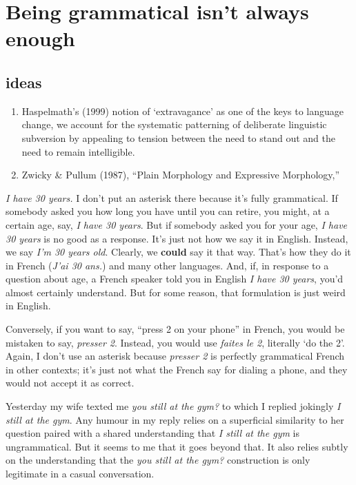 \chapter{Being grammatical isn't always enough}

\section{ideas}
\begin{enumerate}
    \item Haspelmath's (1999) notion of `extravagance' as one of the keys to language change, we account for the systematic patterning of deliberate linguistic subversion by appealing to tension between the need to stand out and the need to remain intelligible.
    \item Zwicky \& Pullum (1987), ``Plain Morphology and Expressive Morphology,''
\end{enumerate}

\textit{I have 30 years.} I don't put an asterisk there because it's fully grammatical. If somebody asked you how long you have until you can retire, you might, at a certain age, say, \textit{I have 30 years}. But if somebody asked you for your age, \textit{I have 30 years} is no good as a response. It's just not how we say it in English. Instead, we say \textit{I'm 30 years old}. Clearly, we \textbf{could} say it that way. That's how they do it in French (\textit{J'ai 30 ans.}) and many other languages. And, if, in response to a question about age, a French speaker told you in English \textit{I have 30 years}, you'd almost certainly understand. But for some reason, that formulation is just weird in English.

Conversely, if you want to say, ``press 2 on your phone'' in French, you would be mistaken to say, \textit{presser 2}. Instead, you would use \textit{faites le 2}, literally `do the 2'. Again, I don't use an asterisk because \textit{presser 2} is perfectly grammatical French in other contexts; it's just not what the French say for dialing a phone, and they would not accept it as correct.

\bigskip

Yesterday my wife texted me \textit{you still at the gym?} to which I replied jokingly \textit{I still at the gym}. Any humour in my reply relies on a superficial similarity to her question paired with a shared understanding that \textit{I still at the gym} is ungrammatical. But it seems to me that it goes beyond that. It also relies subtly on the understanding that the \textit{you still at the gym?} construction is only legitimate in a casual conversation.

